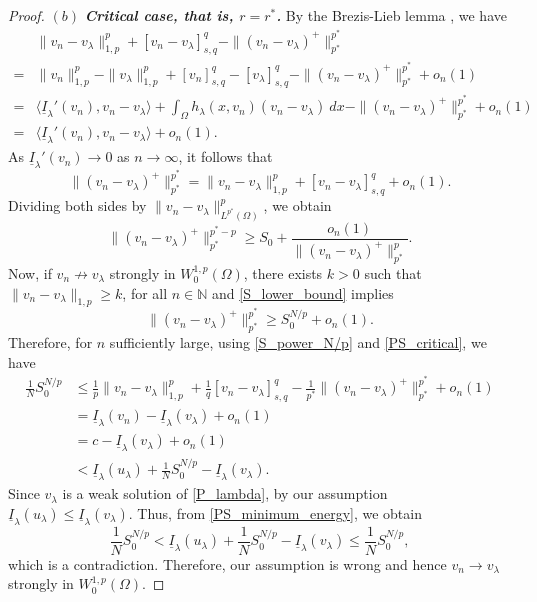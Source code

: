 \documentclass[reqno,oneside]{amsart}
\theoremstyle{definition}
\theoremstyle{remark}
\numberwithin{equation}{section}
\newcommand{\Om} {\Omega}
\newcommand{\rar}{\rightarrow}
\newcommand{\sn}{\mathbb{N}}
\newcommand{\wop}{W^{1,p}_0 (\Omega)}
\newcommand{\il}{\underline{I}}
\newcommand{\la} {\lambda}
\begin{document}
\begin{proof}
    \noindent$(b)$ \textit{\textbf{Critical case, that is, $r=r^*$.}} By the Brezis-Lieb lemma \cite{brezis1983lieb}, we have
    \begin{equation*}
        \begin{aligned}
            &\|v_n - v_{\la}\|^p_{1,p} + [v_n - v_{\la}]^q_{s,q} - \|(v_n - v_{\la})^+\|^{p^*}_{p^*}\\
            = & \|v_n\|^p_{1,p} - \|v_{\la}\|^p_{1,p} + [v_n]^q_{s,q} - [v_{\la}]^q_{s,q} - \|(v_n - v_{\la})^+\|^{p^*}_{p^*} + o_n (1)\\
            = & \langle \il_{\la}' (v_n), v_n - v_{\la} \rangle + \int_{\Om} h_{\la} (x, v_n) (v_n - v_{\la})\ dx - \|(v_n - v_{\la})^+\|^{p^*}_{p^*} + o_n (1)\\
            = & \langle \il_{\la}' (v_n), v_n - v_{\la} \rangle + o_n (1).
        \end{aligned}
    \end{equation*}
    As $\il_{\la}' (v_n) \rar 0$ as $n \rar\infty$, it follows that
    \begin{equation}\label{PS_critical}
        \|(v_n - v_{\la})^+\|^{p^*}_{p^*} = \|v_n - v_{\la}\|^p_{1,p} + [v_n - v_{\la}]^q_{s,q} + o_n (1).
    \end{equation}
    Dividing both sides by $\|v_n - v_{\la}\|^p_{L^{p^*} (\Om)}$, we obtain
    \begin{equation}\label{S_lower_bound}
        \|(v_n - v_{\la})^+\|^{p^* -p}_{p^*} \geq S_0 + \frac{o_n (1)}{\|(v_n - v_{\la})^+\|^p_{p^*}}.
    \end{equation}
    Now, if $v_n \not\rar v_{\la}$ strongly in $\wop$, there exists $k>0$ such that $\|v_n - v_{\la}\|_{1,p} \geq k$, for all $n\in \sn$ and \eqref{S_lower_bound} implies
    \begin{equation}\label{S_power_N/p}
        \|(v_n - v_{\la})^+\|^{p^*}_{p^*} \geq S_0^{N/p} + o_n (1).
    \end{equation}
    Therefore, for $n$ sufficiently large, using \eqref{S_power_N/p} and \eqref{PS_critical}, we have
    \begin{equation}\label{PS_minimum_energy}
        \begin{aligned}
            \frac{1}{N} S_0^{N/p} &\leq \frac{1}{p} \|v_n - v_{\la}\|^p_{1,p} + \frac{1}{q} [v_n - v_{\la}]^q_{s,q} - \frac{1}{p^*} \|(v_n - v_{\la})^+ \|^{p^*}_{p^*} + o_n (1)\\[2mm]
            &= \il_{\la} (v_n) - \il_{\la} (v_{\la}) + o_n (1)\\[2mm]
            &= c - \il_{\la} (v_{\la}) + o_n (1)\\[2mm]
            &< \il_{\la} (u_{\la}) + \frac{1}{N} S_0^{N/p} - \il_{\la} (v_{\la}) .
        \end{aligned}
    \end{equation}
    Since $v_{\la}$ is a weak solution of \eqref{P_lambda}, by our assumption $\il_{\la} (u_{\la}) \leq \il_{\la} (v_{\la})$. Thus, from \eqref{PS_minimum_energy}, we obtain
    \[\frac{1}{N} S_0^{N/p} < \il_{\la} (u_{\la}) + \frac{1}{N} S_0^{N/p} - \il_{\la} (v_{\la}) \leq \frac{1}{N} S_0^{N/p},\]
    which is a contradiction. Therefore, our assumption is wrong and hence $v_n \rar v_{\la}$ strongly in $\wop$.
\end{proof}
\end{document}
